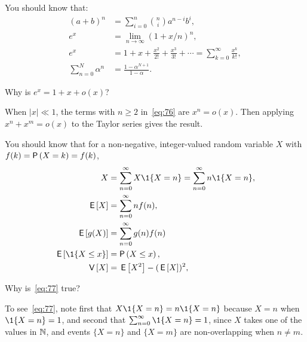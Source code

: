 You should know that:
\begin{subequations}
  \begin{align}
    (a+b)^n &= \sum_{i=0}^n {n \choose i} a^{n-i} b^i, \label{eq:71}\\
e^x &= \lim_{n\to\infty} (1+x/n)^n, \label{eq:65}\\
    e^x &= 1 + x + \frac{x^2}{2!} + \frac{x^3}{3!} + \cdots = \sum_{k=0}^{\infty} \frac{x^k}{k!}, \label{eq:76}\\
    \sum_{n=0}^N \alpha^n &= \frac{1-\alpha^{N+1}}{1-\alpha}. \label{eq:61}
\end{align}
\end{subequations}

\begin{extra}
  Why is $e^{x} = 1 +x + o(x)$?
\begin{solution}
    When $|x|\ll 1$, the  terms with $n\geq 2$ in~\cref{eq:76} are $x^n = o(x)$. Then applying $x^n + x^m = o(x)$ to the Taylor series gives the result.
\end{solution}
\end{extra}


You should know that for a non-negative, integer-valued random variable $X$ with   $f(k)= \P{X = k} = f(k)$, 
\begin{subequations}
\begin{align}
X&=\sum_{n=0}^\infty X\1{X=n} = \sum_{n=0}^\infty n \1{X=n},   \label{eq:77} \\
\E X &= \sum_{n=0}^\infty n f(n), \\
\E{g(X)} &= \sum_{n=0}^\infty g(n) f(n)  \label{eq:66}\\
\E{\1{X\leq x}} &= \P{X\leq x}, \label{eq:74}\\
\V X &= \E{X^2} - (\E X)^2,\label{eq:68}
\end{align}
\end{subequations}

\begin{extra}
  Why is~\cref{eq:77} true?
\begin{solution}
To see~\cref{eq:77}, note first that $X\1{X=n} = n\1{X=n}$ because $X=n$ when $\1{X=n} =1$, and second that $\sum_{n=0}^\infty \1{X=n} =1$, since $X$ takes one of the values in $\mathbb{N}$, and events $\{X=n\}$ and $\{X=m\}$ are non-overlapping when $n\neq m$. 
\end{solution}
\end{extra}

